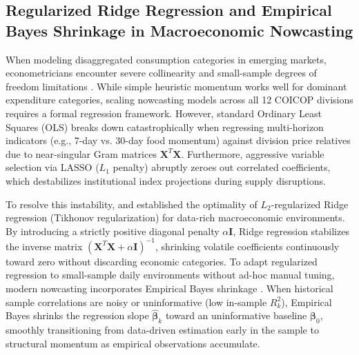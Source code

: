 \subsection{Regularized Ridge Regression and Empirical Bayes Shrinkage in Macroeconomic Nowcasting}
\hs When modeling disaggregated consumption categories in emerging markets, econometricians encounter severe collinearity and small-sample degrees of freedom limitations \citep{hoerl1970ridge, demol2008forecasting}. While simple heuristic momentum works well for dominant expenditure categories, scaling nowcasting models across all 12 COICOP divisions requires a formal regression framework. However, standard Ordinary Least Squares (OLS) breaks down catastrophically when regressing multi-horizon indicators (e.g., 7-day vs. 30-day food momentum) against division price relatives due to near-singular Gram matrices $\mathbf{X}^T \mathbf{X}$. Furthermore, aggressive variable selection via LASSO ($L_1$ penalty) abruptly zeroes out correlated coefficients, which destabilizes institutional index projections during supply disruptions.

\hs To resolve this instability, \cite{hoerl1970ridge} and \cite{demol2008forecasting} established the optimality of $L_2$-regularized Ridge regression (Tikhonov regularization) for data-rich macroeconomic environments. By introducing a strictly positive diagonal penalty $\alpha \mathbf{I}$, Ridge regression stabilizes the inverse matrix $(\mathbf{X}^T \mathbf{X} + \alpha \mathbf{I})^{-1}$, shrinking volatile coefficients continuously toward zero without discarding economic categories. To adapt regularized regression to small-sample daily environments without ad-hoc manual tuning, modern nowcasting incorporates Empirical Bayes shrinkage \citep{bis2024spectrum}. When historical sample correlations are noisy or uninformative (low in-sample $R_k^2$), Empirical Bayes shrinks the regression slope $\hat{\boldsymbol{\beta}}_k$ toward an uninformative baseline $\boldsymbol{\beta}_0$, smoothly transitioning from data-driven estimation early in the sample to structural momentum as empirical observations accumulate.

